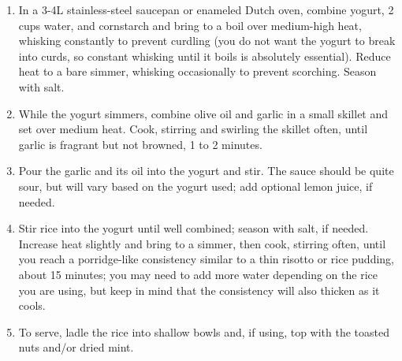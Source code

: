 \begin{enumerate}
    \item In a 3-4L stainless-steel saucepan or enameled Dutch oven, combine yogurt, 2 cups water, and cornstarch and bring to a boil over medium-high heat, whisking constantly to prevent curdling (you do not want the yogurt to break into curds, so constant whisking until it boils is absolutely essential). Reduce heat to a bare simmer, whisking occasionally to prevent scorching. Season with salt.
    \item While the yogurt simmers, combine olive oil and garlic in a small skillet and set over medium heat. Cook, stirring and swirling the skillet often, until garlic is fragrant but not browned, 1 to 2 minutes.
    \item Pour the garlic and its oil into the yogurt and stir. The sauce should be quite sour, but will vary based on the yogurt used; add optional lemon juice, if needed.
    \item Stir rice into the yogurt until well combined; season with salt, if needed. Increase heat slightly and bring to a simmer, then cook, stirring often, until you reach a porridge-like consistency similar to a thin risotto or rice pudding, about 15 minutes; you may need to add more water depending on the rice you are using, but keep in mind that the consistency will also thicken as it cools.
    \item To serve, ladle the rice into shallow bowls and, if using, top with the toasted nuts and/or dried mint.
\end{enumerate}
